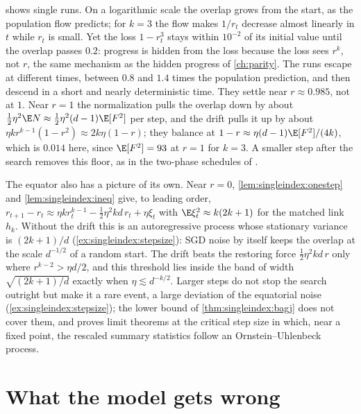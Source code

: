 \begin{refsection}
 shows single runs. On a logarithmic scale the overlap grows from the start, as the population flow predicts; for $k=3$ the flow makes $1/r_t$ decrease almost linearly in $t$ while $r_t$ is small. Yet the loss $1-r_t^3$ stays within $10^{-2}$ of its initial value until the overlap passes $0.2$: progress is hidden from the loss because the loss sees $r^k$, not $r$, the same mechanism as the hidden progress of \cref{ch:parity}. The runs escape at different times, between $0.8$ and $1.4$ times the population prediction, and then descend in a short and nearly deterministic time. They settle near $r\approx0.985$, not at $1$. Near $r=1$ the normalization pulls the overlap down by about $\frac12\eta^2\E N\approx\frac12\eta^2(d-1)\E[F^2]$ per step, and the drift pulls it up by about $\eta kr^{k-1}(1-r^2)\approx2k\eta(1-r)$; they balance at $1-r\approx\eta(d-1)\E[F^2]/(4k)$, which is $0.014$ here, since $\E[F^2]=93$ at $r=1$ for $k=3$. A smaller step after the search removes this floor, as in the two-phase schedules of \textcite{DamianEtAl2023}.

The equator also has a picture of its own. Near $r=0$, \cref{lem:singleindex:onestep} and \cref{lem:singleindex:ineq} give, to leading order, $r_{t+1}-r_t\approx\eta kr_t^{k-1}-\frac12\eta^2kd\,r_t+\eta\xi_t$ with $\E\xi_t^2\approx k(2k+1)$ for the matched link $h_k$. Without the drift this is an autoregressive process whose stationary variance is $(2k+1)/d$ (\cref{ex:singleindex:stepsize}): SGD noise by itself keeps the overlap at the scale $d^{-1/2}$ of a random start. The drift beats the restoring force $\frac12\eta^2kd\,r$ only where $r^{k-2}>\eta d/2$, and this threshold lies inside the band of width $\sqrt{(2k+1)/d}$ exactly when $\eta\lesssim d^{-k/2}$. Larger steps do not stop the search outright but make it a rare event, a large deviation of the equatorial noise (\cref{ex:singleindex:stepsize}); the lower bound of \cref{thm:singleindex:bagj} does not cover them, and \textcite{Rangriz2026} proves limit theorems at the critical step size in which, near a fixed point, the rescaled summary statistics follow an Ornstein--Uhlenbeck process.

\section{What the model gets wrong}\label{sec:singleindex:wrong}


\end{refsection}
